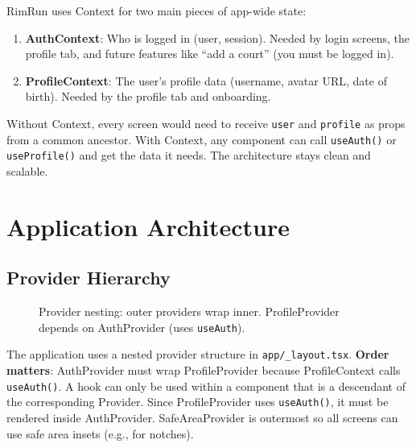\documentclass[11pt,a4paper]{article}
\begin{document}
RimRun uses Context for two main pieces of app-wide state:

\begin{enumerate}
    \item \textbf{AuthContext}: Who is logged in (user, session). Needed by login screens, the profile tab, and future features like ``add a court'' (you must be logged in).
    \item \textbf{ProfileContext}: The user's profile data (username, avatar URL, date of birth). Needed by the profile tab and onboarding.
\end{enumerate}

Without Context, every screen would need to receive \texttt{user} and \texttt{profile} as props from a common ancestor. With Context, any component can call \texttt{useAuth()} or \texttt{useProfile()} and get the data it needs. The architecture stays clean and scalable.

\section{Application Architecture}

\subsection{Provider Hierarchy}

\begin{figure}[h]
\centering
{}
\caption{Provider nesting: outer providers wrap inner. ProfileProvider depends on AuthProvider (uses \texttt{useAuth}).}
\end{figure}

The application uses a nested provider structure in \texttt{app/\_layout.tsx}. \textbf{Order matters}: AuthProvider must wrap ProfileProvider because ProfileContext calls \texttt{useAuth()}. A hook can only be used within a component that is a descendant of the corresponding Provider. Since ProfileProvider uses \texttt{useAuth()}, it must be rendered inside AuthProvider. SafeAreaProvider is outermost so all screens can use safe area insets (e.g., for notches).
\end{document}
